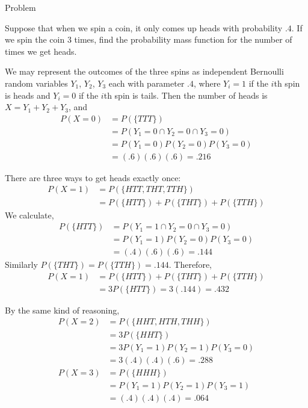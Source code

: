 \documentclass[xcolor=table]{beamer}
\begin{document}
\begin{frame}{Problem}
\begin{block}{}
Suppose that when we spin a coin, it only comes up heads with probability $.4$. If we spin the coin 3 times, find the probability mass function for the number of times we get heads.
\end{block}

\pause We may represent the outcomes of the three spins as independent Bernoulli random variables $Y_1$, $Y_2$, $Y_3$ each with parameter $.4$, where $Y_i=1$ if the $i$th spin is heads and $Y_i=0$ if the $i$th spin is tails. Then the number of heads is $X=Y_1+Y_2+Y_3$, \pause and
\begin{align*}
P(X=0)&=P(\{TTT\})\\
&=P(Y_1=0 \cap Y_2=0 \cap Y_3=0)\\
&= P(Y_1=0)P(Y_2=0)P(Y_3=0) \\
&= (.6)(.6)(.6) = .216
\end{align*}
\end{frame}

\begin{frame}
There are three ways to get heads exactly once:
\begin{align*}
P(X=1)&=P(\{HTT, THT, TTH\})\\
&= P(\{HTT\})+P(\{THT\})+P(\{TTH\})
\end{align*}
\pause We calculate,
\begin{align*}
P(\{HTT\})&=P(Y_1=1 \cap Y_2=0 \cap Y_3=0)\\
&= P(Y_1=1)P(Y_2=0)P(Y_3=0) \\
&= (.4)(.6)(.6) = .144
\end{align*}
\pause Similarly $P(\{THT\})=P(\{TTH\})=.144$. Therefore,
\begin{align*}
P(X=1) &= P(\{HTT\})+P(\{THT\})+P(\{TTH\})\\
&= 3P(\{HTT\}) = 3(.144)= .432
\end{align*}

\end{frame}

\begin{frame}
By the same kind of reasoning,
\begin{align*}
P(X=2)&=P(\{HHT,HTH,THH\}) \\
&= 3P(\{HHT\}) \\
&= 3P(Y_1=1)P(Y_2=1)P(Y_3=0) \\
&= 3(.4)(.4)(.6) = .288 \\[.5cm]
P(X=3)&=P(\{HHH\}) \\
&= P(Y_1=1)P(Y_2=1)P(Y_3=1) \\
&= (.4)(.4)(.4) = .064
\end{align*}
\end{frame}
\end{document}
